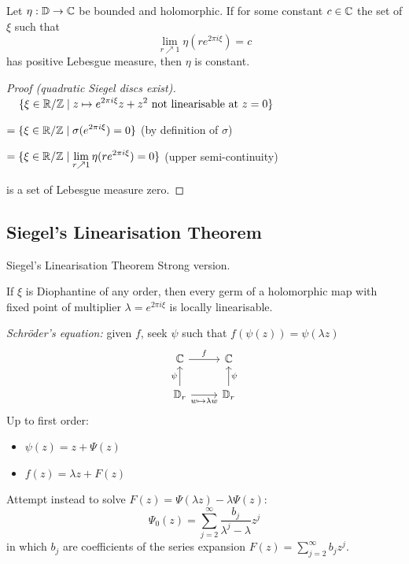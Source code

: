 \begin{frame}
\begin{lem}\label{lem:A.3}
    Let $\eta: \mathbb{D} \to \mathbb{C}$ be bounded and holomorphic. If for some constant $c \in \mathbb{C}$ the set of $\xi$ such that
    \[
    \lim_{r\nearrow 1} \eta (r e^{2\pi i \xi}) = c
    \]
    has positive Lebesgue measure, then $\eta$ is constant.
\end{lem}
\vspace{1em}
\pause

\begin{proof}[Proof (quadratic Siegel discs exist)]

$\displaystyle \phantom{=}\ \{ \xi \in \mathbb{R}/\mathbb{Z} \mid
   z \mapsto e^{2\pi i \xi} z + z^2 \text{ not linearisable at $z = 0$} \}$

$\displaystyle = \{ \xi \in \mathbb{R}/\mathbb{Z} \mid
    \sigma(e^{2\pi i \xi}) = 0 \}$ \hfill {\footnotesize(by definition of $\sigma$)}

$\displaystyle = \{ \xi \in \mathbb{R}/\mathbb{Z} \mid
    \lim_{r \nearrow 1} \eta(r e^{2\pi i \xi}) = 0 \} $ \hfill {\footnotesize(upper semi-continuity)}
    
is a set of Lebesgue measure zero.
\end{proof}
\end{frame}


\subsection{Siegel's Linearisation Theorem}
\begin{frame}{Siegel's Linearisation Theorem}
Strong version.

\begin{theorem}[Siegel 1942]
If $\xi$ is Diophantine of any order, then every germ of a holomorphic map with fixed point of multiplier $\lambda = e^{2\pi i\xi}$ is locally linearisable.
\end{theorem}
\end{frame}

\begin{frame}
\emph{Schröder's equation:} given $f$, seek $\psi$ such that $f(\psi(z)) = \psi(\lambda z)$
\[
\begin{tikzcd}[ampersand replacement=\&]
\C \ar[r, "f"] \& \C\\
\D_r \ar[u, "\psi"] \ar[r, "w \mapsto \lambda w"'] \& \D_r \ar[u, "\psi"']
\end{tikzcd}
\]
\pause
Up to first order:
\begin{itemize}
    \item $\psi(z) = z + \Psi(z)$
    \item $f(z) = \lambda z + F(z)$
\end{itemize}

Attempt instead to solve $F(z) = \Psi(\lambda z) - \lambda\Psi(z)$:
\pause
\[
    \Psi_0(z) = \sum_{j=2}^\infty \frac{b_j}{\lambda^j - \lambda}z^j
\]
in which $b_j$ are coefficients of the series expansion $F(z) = \sum_{j=2}^\infty b_j z^j$.
\end{frame}


